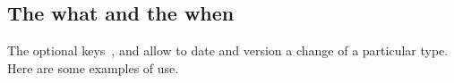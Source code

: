 \documentclass[theme = color]{tutodoc}
\begin{document}
\subsection{The what and the when}

The optional keys \,,  and  allow to date and version a change of a particular type.
Here are some examples of use.

\end{document}
